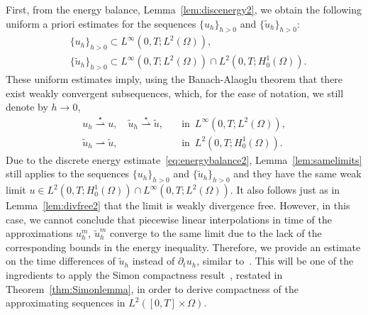 \documentclass[10pt,letterpaper]{amsart}
\newcommand{\tu}{\widetilde{u}}
\newcommand{\dom}{\Omega}
\newcommand{\weak}{\rightharpoonup}
\newcommand{\weakstar}{\overset{\star}\rightharpoonup}
\theoremstyle{definition}{\newtheorem{definition}[lemma]{Definition}}
\numberwithin{equation}{section}
\begin{document}
First, from the energy balance, Lemma~\ref{lem:discenergy2}, we obtain the following uniform a priori estimates for the sequences  $\{{u}_h\}_{h>0}$ and $\{\tu_h\}_{h>0}$:
\begin{align*}
	&\{{u}_h\}_{h>0}\subset L^\infty(0,T;L^2(\dom)),\\
	&\{\widetilde{u}_h\}_{h>0}\subset L^\infty(0,T;L^2(\dom))\cap L^2(0,T;H^1_0(\dom)).
\end{align*}
These uniform estimates imply, using the Banach-Alaoglu theorem that there exist weakly convergent subsequences, which, for the ease of notation, we still denote by $h\to 0$,
\begin{align}
{u}_h\weakstar {u},\quad	\widetilde{u}_h\weakstar \widetilde{u},&\quad \text{in }\, L^\infty(0,T;L^2(\dom)),	\label{eq:uhweakconv2}\\
	\widetilde{u}_h\weak \widetilde{u},&\quad \text{in }\, L^2(0,T;H^1_0(\dom)).\label{eq:Hhweakconv2}
\end{align}
Due to the discrete energy estimate~\eqref{eq:energybalance2}, Lemma~\ref{lem:samelimits} still applies to the sequences $\{{u}_h\}_{h>0}$ and $\{\tu_h\}_{h>0}$ and they have the same weak limit $u\in L^2(0,T;H^1_0(\dom))\cap L^\infty(0,T;L^2(\dom))$. It also follows just as in Lemma~\ref{lem:divfree2} that the limit is weakly divergence free. However, in this case, we cannot conclude that piecewise linear interpolations in time of the approximations $u^m_h$, $\tu_h^m$ converge to the same limit due to the lack of the corresponding bounds in the energy inequality. Therefore, we provide an estimate on the time differences of $\tu_h$ instead of $\partial_t u_h$, similar to~\cite{Eymard2024}. This will be one of the ingredients to apply the Simon compactness result~\cite{Simon1987}, restated in Theorem~\ref{thm:Simonlemma}, in order to derive compactness of the approximating sequences in $L^2([0,T]\times\dom)$.
\end{document}
